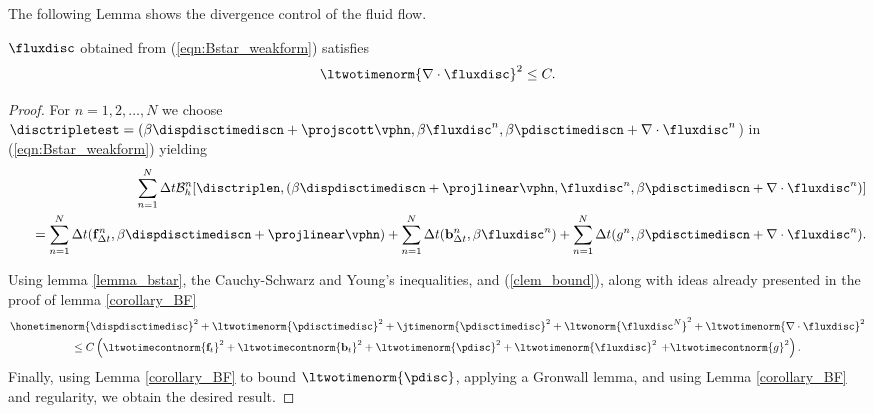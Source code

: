 The following Lemma shows the divergence control of the fluid flow.
\begin{lemma}
\label{corollary_Bstar}
$ \fluxdisc$ obtained from (\ref{eqn:Bstar_weakform}) satisfies
\begin{equation*}
 \ltwotimenorm{\nabla \cdot \fluxdisc}^{2} \leq C.
\end{equation*}
\end{lemma}
\begin{proof}

For $n = 1,2, \ldots , N$ we choose $\disctripletest = (\beta \dispdisctimediscn + \projscott \vphn,   \beta \fluxdisc^{n},   \beta \pdisctimediscn + \nabla \cdot \fluxdisc^{n} $) in (\ref{eqn:Bstar_weakform})  yielding
\begin{eqnarray*}
&&\sum^{N}_{n=1} \Delta t \mathcal{B}_{h}^{n}[\disctriplen,(\beta \dispdisctimediscn + \projlinear \vphn, \fluxdisc^{n} ,\beta \pdisctimediscn + \nabla \cdot \fluxdisc^{n})]  \\
&& \quad =  \sum^{N}_{n=1} \Delta t (\mathbf{f}^{n}_{\Delta t},\beta \dispdisctimediscn + \projlinear \vphn) + \sum^{N}_{n=1} \Delta t (\mathbf{b}^{n}_{\Delta t},\beta\fluxdisc^{n}) +\sum^{N}_{n=1} \Delta t(g^{n},\beta\pdisctimediscn+ \nabla \cdot \fluxdisc^{n}).
\end{eqnarray*}

Using lemma \ref{lemma_bstar}, the Cauchy-Schwarz and Young's inequalities, and (\ref{clem_bound}), along with ideas already presented in the proof of lemma \ref{corollary_BF}
\begin{multline*}\honetimenorm{\dispdisctimedisc}^{2} +  \ltwotimenorm{\pdisctimedisc}^{2} +   \jtimenorm{\pdisctimedisc}^{2}  +  \ltwonorm{\fluxdisc^{N}}^{2}
+ \ltwotimenorm{\nabla \cdot \fluxdisc}^{2} \\
\leq  C \left(  \ltwotimecontnorm{{\mathbf{f}}_{t}}^{2} +   \ltwotimecontnorm{{\mathbf{b}}_{t}}^{2}  +  \ltwotimenorm{\pdisc}^{2}  +\ltwotimenorm{\fluxdisc}^{2} \right.  \left. +   \ltwotimecontnorm{{g}}^{2}  \right) .
\end{multline*}
Finally, using Lemma \ref{corollary_BF} to bound $\ltwotimenorm{\pdisc}$, applying a Gronwall lemma, and using Lemma \ref{corollary_BF} and regularity, we obtain the desired result.

\end{proof}



